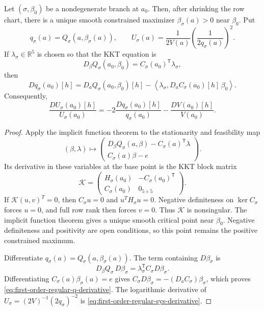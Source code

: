 \begin{proposition}
\label{prop:first-order-regular-branch}
Let \((\sigma,\beta_0)\) be a nondegenerate branch at \(a_0\).  Then, after
shrinking the row chart, there is a unique smooth constrained maximizer
\(\beta_\sigma(a)>0\) near \(\beta_0\).  Put
\[
  q_\sigma(a)=Q_\sigma(a,\beta_\sigma(a)),
  \qquad
  U_\sigma(a)=
  \frac{1}{2V(a)}\left(\frac{1}{2q_\sigma(a)}\right)^2.
\]
If \(\lambda_\sigma\in\mathbb R^5\) is chosen so that the KKT equation is
\[
  D_\beta Q_\sigma(a_0,\beta_0)
  =C_\sigma(a_0)^{\mathsf T}\lambda_\sigma,
\]
then
\begin{equation}\label{eq:first-order-regular-q-derivative}
  Dq_\sigma(a_0)[h]
  =D_aQ_\sigma(a_0,\beta_0)[h]
   -\left\langle
      \lambda_\sigma,
      D_aC_\sigma(a_0)[h]\,\beta_0
    \right\rangle.
\end{equation}
Consequently,
\begin{equation}\label{eq:first-order-regular-sys-derivative}
  \frac{DU_\sigma(a_0)[h]}{U_\sigma(a_0)}
  =-2\frac{Dq_\sigma(a_0)[h]}{q_\sigma(a_0)}
   -\frac{DV(a_0)[h]}{V(a_0)}.
\end{equation}
\end{proposition}

\begin{proof}
Apply the implicit function theorem to the stationarity and feasibility map
\[
 (\beta,\lambda)\longmapsto
 \begin{pmatrix}
 D_\beta Q_\sigma(a,\beta)-C_\sigma(a)^{\mathsf T}\lambda\\
 C_\sigma(a)\beta-e
 \end{pmatrix}.
\]
Its derivative in these variables at the base point is the KKT block matrix
\[
 \mathcal K=
 \begin{pmatrix}
 H_\sigma(a_0)&-C_\sigma(a_0)^{\mathsf T}\\
 C_\sigma(a_0)&0_{5\times5}
 \end{pmatrix}.
\]
If $\mathcal K(u,v)^T=0$, then $C_\sigma u=0$ and
$u^TH_\sigma u=0$. Negative definiteness on $\ker C_\sigma$ forces
$u=0$, and full row rank then forces $v=0$. Thus $\mathcal K$ is
nonsingular. The implicit function theorem gives a unique smooth
critical point near \(\beta_0\).  Negative definiteness and positivity are
open conditions, so this point remains the positive constrained maximum.

Differentiate
\(q_\sigma(a)=Q_\sigma(a,\beta_\sigma(a))\).  The term containing
\(D\beta_\sigma\) is
\[
  D_\beta Q_\sigma\,D\beta_\sigma
  =\lambda_\sigma^{\mathsf T}
    C_\sigma D\beta_\sigma.
\]
Differentiating
\(C_\sigma(a)\beta_\sigma(a)=e\) gives
\(C_\sigma D\beta_\sigma=-(D_aC_\sigma)\beta_\sigma\), which proves
\eqref{eq:first-order-regular-q-derivative}.  The logarithmic derivative of
\(U_\sigma=(2V)^{-1}(2q_\sigma)^{-2}\) is
\eqref{eq:first-order-regular-sys-derivative}.
\end{proof}

